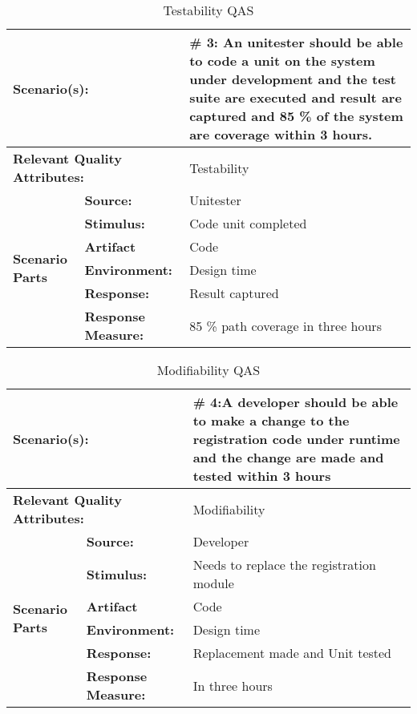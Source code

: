 \begin{table}[H]
\begin{center}
\begin{tabular}{|p{0.3cm}|p{2.5cm}|p{8cm}|}
  \hline
  \multicolumn{2}{|p{3cm}|}{\bfseries Scenario(s):} & \#  3: An unitester should be able to code a unit on the system under development and the test suite are executed and result are captured and 85 \% of the system are coverage within 3 hours. \\
  \hline
  \multicolumn{2}{|p{3cm}|}{\bfseries Relevant Quality Attributes:} & Testability\\
  \hline
  \multirow{6}{*}{\begin{sideways}{\bfseries Scenario Parts}\end{sideways}}
  & {\bfseries Source:} & Unitester \\
  \cline{2-3}
  & {\bfseries Stimulus:} & Code unit completed \\
  \cline{2-3}
  & {\bfseries Artifact} &  Code \\
  \cline{2-3}
  & {\bfseries Environment:} &  Design time \\
  \cline{2-3}
  & {\bfseries Response:} &  Result captured\\
  \cline{2-3}
  & {\bfseries Response Measure:} & 85 \% path coverage in three hours\\
  \hline
\end{tabular}
\caption{Testability QAS}
\end{center}
\end{table}




\begin{table}[H]
\begin{center}
\begin{tabular}{|p{0.3cm}|p{2.5cm}|p{8cm}|}
  \hline
  \multicolumn{2}{|p{3cm}|}{\bfseries Scenario(s):} & \#  4:A developer should be able to make a change to the registration code under runtime and the change are made and tested within 3 hours \\
  \hline
  \multicolumn{2}{|p{3cm}|}{\bfseries Relevant Quality Attributes:} & Modifiability\\
  \hline
  \multirow{6}{*}{\begin{sideways}{\bfseries Scenario Parts}\end{sideways}}
  & {\bfseries Source:} & Developer \\
  \cline{2-3}
  & {\bfseries Stimulus:} & Needs to replace the registration module \\
  \cline{2-3}
  & {\bfseries Artifact} &  Code \\
  \cline{2-3}
  & {\bfseries Environment:} &  Design time \\
  \cline{2-3}
  & {\bfseries Response:} &  Replacement made and Unit tested\\
  \cline{2-3}
  & {\bfseries Response Measure:} & In three hours\\
  \hline
\end{tabular}
\caption{Modifiability QAS}
\end{center}
\end{table}




